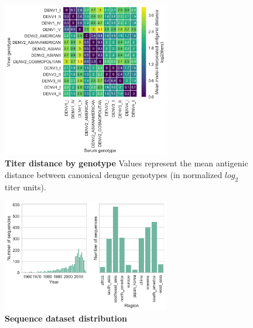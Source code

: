 \documentclass[11pt,oneside,letterpaper]{article}
\begin{document}
\begin{figure}[h]
\centering
	\includegraphics[width=0.65\textwidth]{../figures/png/genotype_dTiter_heatmap.png}
	\caption{\textbf{Titer distance by genotype}
  Values represent the mean antigenic distance between canonical dengue genotypes (in normalized $log_2$ titer units).
  }
	\label{genotype_dTiter_heatmap}
\end{figure}

\begin{figure}[h]
\centering
	\includegraphics[width=0.65\textwidth]{../figures/png/sequence_distribution.png}
	\caption{\textbf{Sequence dataset distribution}
	}
	\label{sequence_distribution}
\end{figure}


%

%
%
%
%

\end{document}
